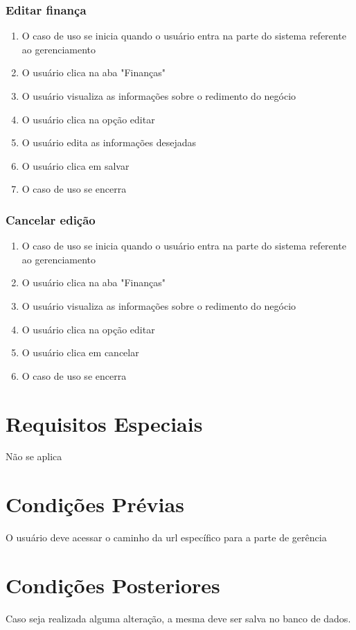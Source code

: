 \subsubsection{Editar finança}
\begin{enumerate}
	\item O caso de uso se inicia quando o usuário entra na parte do sistema referente ao gerenciamento
	\item O usuário clica na aba "Finanças"
	\item O usuário visualiza as informações sobre o redimento do negócio
	\item O usuário clica na opção editar
	\item O usuário edita as informações desejadas
	\item O usuário clica em salvar
	\item O caso de uso se encerra
\end{enumerate}

\subsubsection{Cancelar edição}
\begin{enumerate}
	\item O caso de uso se inicia quando o usuário entra na parte do sistema referente ao gerenciamento
	\item O usuário clica na aba "Finanças"
	\item O usuário visualiza as informações sobre o redimento do negócio
	\item O usuário clica na opção editar
	\item O usuário clica em cancelar
	\item O caso de uso se encerra
\end{enumerate}

\section{Requisitos Especiais}

Não se aplica

\section{Condições Prévias}

O usuário deve acessar o caminho da url específico para a parte de gerência

\section{Condições Posteriores}

Caso seja realizada alguma alteração, a mesma deve ser salva no banco de dados.